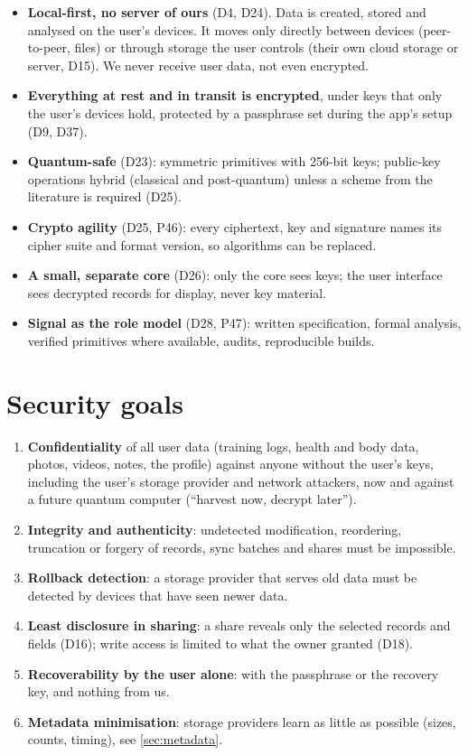 \documentclass[11pt,a4paper]{article}
\newcommand{\dref}[1]{\textsf{#1}} %
\begin{document}
\begin{itemize}
  \item \textbf{Local-first, no server of ours} (\dref{D4}, \dref{D24}). Data is created, stored and analysed on the user's devices. It moves only directly between devices (peer-to-peer, files) or through storage the user controls (their own cloud storage or server, \dref{D15}). We never receive user data, not even encrypted.
  \item \textbf{Everything at rest and in transit is encrypted}, under keys that only the user's devices hold, protected by a passphrase set during the app's setup (\dref{D9}, \dref{D37}).
  \item \textbf{Quantum-safe} (\dref{D23}): symmetric primitives with 256-bit keys; public-key operations hybrid (classical and post-quantum) unless a scheme from the literature is required (\dref{D25}).
  \item \textbf{Crypto agility} (\dref{D25}, \dref{P46}): every ciphertext, key and signature names its cipher suite and format version, so algorithms can be replaced.
  \item \textbf{A small, separate core} (\dref{D26}): only the core sees keys; the user interface sees decrypted records for display, never key material.
  \item \textbf{Signal as the role model} (\dref{D28}, \dref{P47}): written specification, formal analysis, verified primitives where available, audits, reproducible builds.
\end{itemize}

\section{Security goals}

\begin{enumerate}[label=G\arabic*]
  \item \textbf{Confidentiality} of all user data (training logs, health and body data, photos, videos, notes, the profile) against anyone without the user's keys, including the user's storage provider and network attackers, now and against a future quantum computer (``harvest now, decrypt later'').
  \item \textbf{Integrity and authenticity}: undetected modification, reordering, truncation or forgery of records, sync batches and shares must be impossible.
  \item \textbf{Rollback detection}: a storage provider that serves old data must be detected by devices that have seen newer data.
  \item \textbf{Least disclosure in sharing}: a share reveals only the selected records and fields (\dref{D16}); write access is limited to what the owner granted (\dref{D18}).
  \item \textbf{Recoverability by the user alone}: with the passphrase or the recovery key, and nothing from us.
  \item \textbf{Metadata minimisation}: storage providers learn as little as possible (sizes, counts, timing), see \cref{sec:metadata}.
\end{enumerate}
\end{document}

